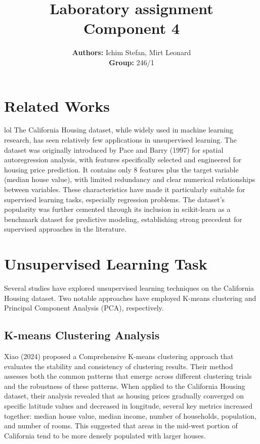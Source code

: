 \documentclass[a4paper, 11pt]{article}
\title{\textbf{Laboratory assignment} \\[1ex] \large \textbf{Component} {4}}
\author{\textbf{Authors:} {Ichim Stefan, Mirt Leonard}\\ \textbf{Group:} {246/1}}
\begin{document}
\maketitle

\section*{Related Works}
lol
The California Housing dataset, while widely used in machine learning research, has seen relatively few applications in unsupervised learning.
The dataset was originally introduced by Pace and Barry (1997) for spatial autoregression analysis, with features specifically selected and engineered for housing price prediction. It contains only 8 features plus the target variable (median house value), with limited redundancy and clear numerical relationships between variables. These characteristics have made it particularly suitable for supervised learning tasks, especially regression problems. The dataset's popularity was further cemented through its inclusion in scikit-learn as a benchmark dataset for predictive modeling, establishing strong precedent for supervised approaches in the literature.

\section{Unsupervised Learning Task}

Several studies have explored unsupervised learning techniques on the California Housing dataset. Two notable approaches have employed K-means clustering and Principal Component Analysis (PCA), respectively.

\subsection{K-means Clustering Analysis}
Xiao (2024) proposed a Comprehensive K-means clustering approach that evaluates the stability and consistency of clustering results. Their method assesses both the common patterns that emerge across different clustering trials and the robustness of these patterns. When applied to the California Housing dataset, their analysis revealed that as housing prices gradually converged on specific latitude values and decreased in longitude, several key metrics increased together: median house value, median income, number of households, population, and number of rooms. This suggested that areas in the mid-west portion of California tend to be more densely populated with larger houses.
\end{document}
